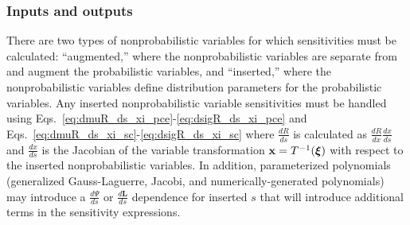 \subsubsection{Inputs and outputs} \label{ouu:sebdo:ssa:io}

There are two types of nonprobabilistic variables for which
sensitivities must be calculated: ``augmented,'' where the
nonprobabilistic variables are separate from and augment the
probabilistic variables, and ``inserted,'' where the nonprobabilistic
variables define distribution parameters for the probabilistic
variables.  %
Any inserted nonprobabilistic variable sensitivities must be handled
using Eqs.~\ref{eq:dmuR_ds_xi_pce}-\ref{eq:dsigR_ds_xi_pce} and
Eqs.~\ref{eq:dmuR_ds_xi_sc}-\ref{eq:dsigR_ds_xi_sc} where
$\frac{dR}{ds}$ is calculated as $\frac{dR}{dx} \frac{dx}{ds}$ and
$\frac{dx}{ds}$ is the Jacobian of the variable transformation 
${\bf x} = T^{-1}(\boldsymbol{\xi})$ with respect to the inserted
nonprobabilistic variables.  In addition, parameterized polynomials
(generalized Gauss-Laguerre, Jacobi, and numerically-generated
polynomials) may introduce a $\frac{d\Psi}{ds}$ or 
$\frac{d\boldsymbol{L}}{ds}$ dependence for inserted $s$ that will 
introduce additional terms in the sensitivity expressions.

